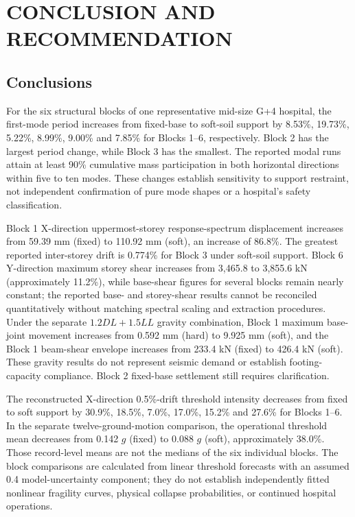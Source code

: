 \chapter{CONCLUSION AND RECOMMENDATION}
\section{Conclusions}
For the six structural blocks of one representative mid-size G+4 hospital, the first-mode period increases from fixed-base to soft-soil support by 8.53\%, 19.73\%, 5.22\%, 8.99\%, 9.00\% and 7.85\% for Blocks 1--6, respectively. Block 2 has the largest period change, while Block 3 has the smallest. The reported modal runs attain at least 90\% cumulative mass participation in both horizontal directions within five to ten modes. These changes establish sensitivity to support restraint, not independent confirmation of pure mode shapes or a hospital's safety classification.

Block 1 X-direction uppermost-storey response-spectrum displacement increases from 59.39 mm (fixed) to 110.92 mm (soft), an increase of 86.8\%. The greatest reported inter-storey drift is 0.774\% for Block 3 under soft-soil support. Block 6 Y-direction maximum storey shear increases from 3,465.8 to 3,855.6 kN (approximately 11.2\%), while base-shear figures for several blocks remain nearly constant; the reported base- and storey-shear results cannot be reconciled quantitatively without matching spectral scaling and extraction procedures. Under the separate $1.2DL+1.5LL$ gravity combination, Block 1 maximum base-joint movement increases from 0.592 mm (hard) to 9.925 mm (soft), and the Block 1 beam-shear envelope increases from 233.4 kN (fixed) to 426.4 kN (soft). These gravity results do not represent seismic demand or establish footing-capacity compliance. Block 2 fixed-base settlement still requires clarification.

The reconstructed X-direction 0.5\%-drift threshold intensity decreases from fixed to soft support by 30.9\%, 18.5\%, 7.0\%, 17.0\%, 15.2\% and 27.6\% for Blocks 1--6. In the separate twelve-ground-motion comparison, the operational threshold mean decreases from 0.142 $g$ (fixed) to 0.088 $g$ (soft), approximately 38.0\%. Those record-level means are not the medians of the six individual blocks. The block comparisons are calculated from linear threshold forecasts with an assumed 0.4 model-uncertainty component; they do not establish independently fitted nonlinear fragility curves, physical collapse probabilities, or continued hospital operations.

